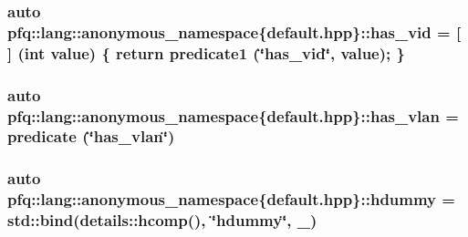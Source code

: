 \hypertarget{namespacepfq_1_1lang_1_1anonymous__namespace_02default_8hpp_03_a99c204d8095fdccd50d4cb24d32e5b5b}{
\subsubsection[{has\+\_\+vid}]{\setlength{\rightskip}{0pt plus 5cm}auto pfq\+::lang\+::anonymous\+\_\+namespace\{default.\+hpp\}\+::has\+\_\+vid = \mbox{[}$\,$\mbox{]} (int value) \{ return {\bf predicate1} (\char`\"{}has\+\_\+vid\char`\"{}, value); \}}}\label{namespacepfq_1_1lang_1_1anonymous__namespace_02default_8hpp_03_a99c204d8095fdccd50d4cb24d32e5b5b}
\hypertarget{namespacepfq_1_1lang_1_1anonymous__namespace_02default_8hpp_03_a1f0378ddfa90777d11ffae5fbb57b4e0}{
\subsubsection[{has\+\_\+vlan}]{\setlength{\rightskip}{0pt plus 5cm}auto pfq\+::lang\+::anonymous\+\_\+namespace\{default.\+hpp\}\+::has\+\_\+vlan = {\bf predicate} (\char`\"{}has\+\_\+vlan\char`\"{})}}\label{namespacepfq_1_1lang_1_1anonymous__namespace_02default_8hpp_03_a1f0378ddfa90777d11ffae5fbb57b4e0}
\hypertarget{namespacepfq_1_1lang_1_1anonymous__namespace_02default_8hpp_03_a5ce9765c320b01cb2c6d9b9cba0f13ff}{
\subsubsection[{hdummy}]{\setlength{\rightskip}{0pt plus 5cm}auto pfq\+::lang\+::anonymous\+\_\+namespace\{default.\+hpp\}\+::hdummy = std\+::bind(details\+::hcomp(), \char`\"{}hdummy\char`\"{}, \+\_)}}\label{namespacepfq_1_1lang_1_1anonymous__namespace_02default_8hpp_03_a5ce9765c320b01cb2c6d9b9cba0f13ff}
